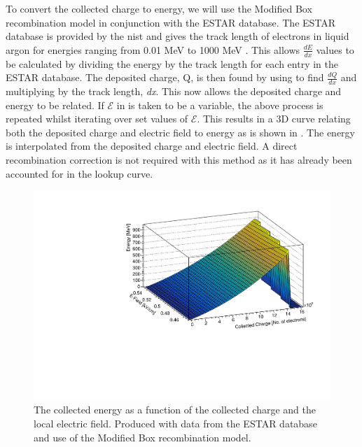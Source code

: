 To convert the collected charge to energy, we will use the Modified Box recombination model in conjunction with the ESTAR database. The ESTAR database is provided by the \Gls{nist} and gives the track length of electrons in liquid argon for energies ranging from 0.01 MeV to 1000 MeV \cite{ESTAR_Database}. This allows $\frac{dE}{dx}$ values to be calculated by dividing the energy by the track length for each entry in the ESTAR database. The deposited charge, Q, is then found by using  to find $\frac{dQ}{dx}$ and multiplying by the track length, \textit{dx}. This now allows the deposited charge and energy to be related. If $\mathcal{E}$ in  is taken to be a variable, the above process is repeated whilst iterating over set values of $\mathcal{E}$. This results in a 3D curve relating both the deposited charge and electric field to energy as is shown in . The energy is interpolated from the deposited charge and electric field. A direct recombination correction is not required with this method as it has already been accounted for in the lookup curve. 

\begin{figure}[h]
    \centering
    \includegraphics[width = \largefigwidth]{Figures/ESTAR_lookup_curve.pdf}
    \caption{The collected energy as a function of the collected charge and the local electric field. Produced with data from the ESTAR database and use of the Modified Box recombination model.}
    \label{fig:ESTAR lookup curve}
\end{figure}

\newpage
